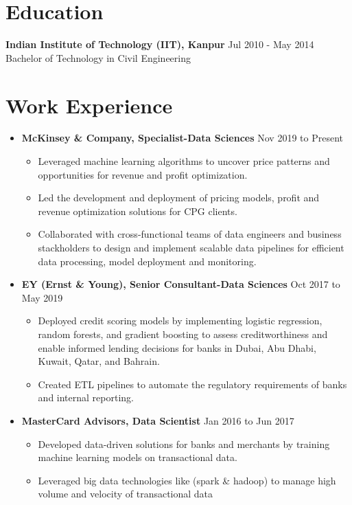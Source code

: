 \documentclass[a4paper,10pt]{article}
\begin{document}
\section*{Education}
\textbf{Indian Institute of Technology (IIT), Kanpur} \hfill \textnormal{Jul 2010 - May 2014} \\
Bachelor of Technology in Civil Engineering

\section*{Work Experience}
\begin{itemize}[leftmargin=0.2cm, label={}]
    \item \textbf{McKinsey \& Company, Specialist-Data Sciences} \hfill \textnormal{Nov 2019 to Present}
    \begin{itemize}[leftmargin=0.5cm, label={\textbullet}]
        \item Leveraged machine learning algorithms to uncover price patterns and opportunities for revenue and profit optimization.
        \item Led the development and deployment of pricing models, profit and revenue optimization solutions for CPG clients.
        \item Collaborated with cross-functional teams of data engineers and business stackholders to design and implement scalable data pipelines for efficient data processing, model deployment and monitoring.
    \end{itemize}
    
    \item \textbf{EY (Ernst \& Young), Senior Consultant-Data Sciences} \hfill \textnormal{Oct 2017 to May 2019}
    \begin{itemize}[leftmargin=0.5cm, label={\textbullet}]
        \item Deployed credit scoring models by implementing logistic regression, random forests, and gradient boosting to assess creditworthiness and enable informed lending decisions for banks in Dubai, Abu Dhabi, Kuwait, Qatar, and Bahrain.
        \item Created ETL pipelines to automate the regulatory requirements of banks and internal reporting.
    \end{itemize}
    
    \item \textbf{MasterCard Advisors, Data Scientist} \hfill \textnormal{Jan 2016 to Jun 2017}
    \begin{itemize}[leftmargin=0.5cm, label={\textbullet}]
        \item Developed data-driven solutions for banks and merchants by training machine learning models on transactional data.
        \item Leveraged big data technologies like (spark \& hadoop) to manage high volume and velocity of transactional data
    \end{itemize}
    

\end{itemize}
\end{document}
